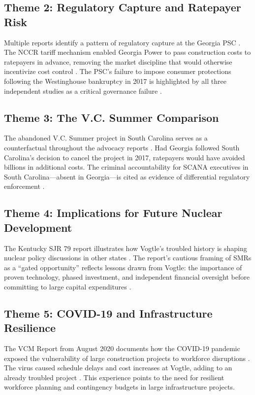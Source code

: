\documentclass[12pt,a4paper]{article}
\begin{document}
\subsection{Theme 2: Regulatory Capture and Ratepayer Risk}

Multiple reports identify a pattern of regulatory capture at the Georgia PSC \cite{gcv_ratepayer,durand_truth,schlissel_ieefa}. The
NCCR tariff mechanism enabled Georgia Power to pass construction costs to ratepayers
in advance, removing the market discipline that would otherwise incentivize cost
control \cite{gcv_ratepayer}. The PSC's failure to impose consumer protections following the Westinghouse
bankruptcy in 2017 is highlighted by all three independent studies as a critical
governance failure \cite{gcv_ratepayer,durand_truth,schlissel_ieefa}.

\subsection{Theme 3: The V.C. Summer Comparison}

The abandoned V.C. Summer project in South Carolina serves as a counterfactual
throughout the advocacy reports \cite{durand_truth,gcv_ratepayer}. Had Georgia followed South Carolina's decision to
cancel the project in 2017, ratepayers would have avoided billions in additional costs.
The criminal accountability for SCANA executives in South Carolina---absent in
Georgia---is cited as evidence of differential regulatory enforcement \cite{durand_truth}.

\subsection{Theme 4: Implications for Future Nuclear Development}

The Kentucky SJR 79 report illustrates how Vogtle's troubled history is shaping
nuclear policy discussions in other states \cite{kentucky_sjr79}. The report's cautious framing of SMRs
as a ``gated opportunity'' reflects lessons drawn from Vogtle: the importance of
proven technology, phased investment, and independent financial oversight before
committing to large capital expenditures \cite{kentucky_sjr79}.

\subsection{Theme 5: COVID-19 and Infrastructure Resilience}

The VCM Report from August 2020 documents how the COVID-19 pandemic exposed the
vulnerability of large construction projects to workforce disruptions \cite{vcm_report}. The virus
caused schedule delays and cost increases at Vogtle, adding to an already troubled
project \cite{vcm_report}. This experience points to the need for resilient workforce planning and
contingency budgets in large infrastructure projects.
\end{document}
